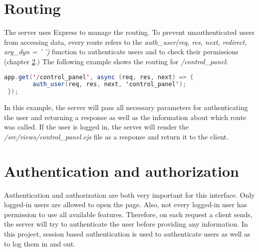 
\section{Routing}
\label{sec:routing}

The server uses Express to manage the routing. To prevent unauthenticated users from accessing data, every route refers to the \textit{auth\_user(req, res, next, redirect, arg\_dyn = ' ')} function to authenticate users and to check their permissions (chapter \ref{sec:authentication_and_authorization}.) The following example shows the routing for \textit{/control\_panel}:

\begin{lstlisting}[language = Java, numbers = none]
 app.get('/control_panel', async (req, res, next) => {
 		auth_user(req, res, next, 'control_panel');
 });
\end{lstlisting}

In this example, the server will pass all necessary parameters for authenticating the user and returning a response as well as the information about which route was called. If the user is logged in, the server will render the \textit{/src/views/control\_panel.ejs} file as a response and return it to the client.





\section{Authentication and authorization}
\label{sec:authentication_and_authorization}

Authentication and authorization are both very important for this interface. Only logged-in users are allowed to open the page. Also, not every logged-in user has permission to use all available features. Therefore, on each request a client sends, the server will try to authenticate the user before providing any information. In this project, session based authentication is used to authenticate users as well as to log them in and out.\\



